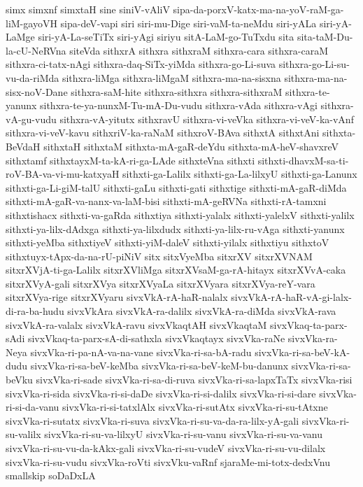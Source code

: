 {simx
simxnf
simxtaH
sine
siniV-vAliV
sipa-da-porxV-katx-ma-na-yoV-raM-ga-liM-gayoVH
sipa-deV-vapi
siri
siri-mu-Dige
siri-vaM-ta-neMdu
siri-yALa
siri-yA-LaMge
siri-yA-La-seTiTx
siri-yAgi
siriyu
sitA-LaM-go-TuTxdu
sita
sita-taM-Du-la-cU-NeRVna
siteVda
sithxrA
sithxra
sithxraM
sithxra-cara
sithxra-caraM
sithxra-ci-tatx-nAgi
sithxra-daq-SiTx-yiMda
sithxra-go-Li-suva
sithxra-go-Li-su-vu-da-riMda
sithxra-liMga
sithxra-liMgaM
sithxra-ma-na-sisxna
sithxra-ma-na-sisx-noV-Dane
sithxra-saM-hite
sithxra-sithxra
sithxra-sithxraM
sithxra-te-yanunx
sithxra-te-ya-nunxM-Tu-mA-Du-vudu
sithxra-vAda
sithxra-vAgi
sithxra-vA-gu-vudu
sithxra-vA-yitutx
sithxravU
sithxra-vi-veVka
sithxra-vi-veV-ka-vAnf
sithxra-vi-veV-kavu
sithxriV-ka-raNaM
sithxroV-BAva
sithxtA
sithxtAni
sithxta-BeVdaH
sithxtaH
sithxtaM
sithxta-mA-gaR-deYdu
sithxta-mA-heV-shavxreV
sithxtamf
sithxtayxM-ta-kA-ri-ga-LAde
sithxteVna
sithxti
sithxti-dhavxM-sa-ti-roV-BA-va-vi-mu-katxyaH
sithxti-ga-Lalilx
sithxti-ga-La-lilxyU
sithxti-ga-Lanunx
sithxti-ga-Li-giM-talU
sithxti-gaLu
sithxti-gati
sithxtige
sithxti-mA-gaR-diMda
sithxti-mA-gaR-va-nanx-va-laM-bisi
sithxti-mA-geRVNa
sithxti-rA-tamxni
sithxtishacx
sithxti-va-gaRda
sithxtiya
sithxti-yalalx
sithxti-yalelxV
sithxti-yalilx
sithxti-ya-lilx-dAdxga
sithxti-ya-lilxdudx
sithxti-ya-lilx-ru-vAga
sithxti-yanunx
sithxti-yeMba
sithxtiyeV
sithxti-yiM-daleV
sithxti-yilalx
sithxtiyu
sithxtoV
sithxtuyx-tApx-da-na-rU-piNiV
sitx
sitxVyeMba
sitxrXV
sitxrXVNAM
sitxrXVjA-ti-ga-Lalilx
sitxrXVliMga
sitxrXVsaM-ga-rA-hitayx
sitxrXVvA-caka
sitxrXVyA-gali
sitxrXVya
sitxrXVyaLa
sitxrXVyara
sitxrXVya-reY-vara
sitxrXVya-rige
sitxrXVyaru
sivxVkA-rA-haR-nalalx
sivxVkA-rA-haR-vA-gi-lalx-di-ra-ba-hudu
sivxVkAra
sivxVkA-ra-dalilx
sivxVkA-ra-diMda
sivxVkA-rava
sivxVkA-ra-valalx
sivxVkA-ravu
sivxVkaqtAH
sivxVkaqtaM
sivxVkaq-ta-parx-sAdi
sivxVkaq-ta-parx-sA-di-sathxla
sivxVkaqtayx
sivxVka-raNe
sivxVka-ra-Neya
sivxVka-ri-pa-nA-va-na-vane
sivxVka-ri-sa-bA-radu
sivxVka-ri-sa-beV-kA-dudu
sivxVka-ri-sa-beV-keMba
sivxVka-ri-sa-beV-keM-bu-danunx
sivxVka-ri-sa-beVku
sivxVka-ri-sade
sivxVka-ri-sa-di-ruva
sivxVka-ri-sa-lapxTaTx
sivxVka-risi
sivxVka-ri-sida
sivxVka-ri-si-daDe
sivxVka-ri-si-dalilx
sivxVka-ri-si-dare
sivxVka-ri-si-da-vanu
sivxVka-ri-si-tatxlAlx
sivxVka-ri-sutAtx
sivxVka-ri-su-tAtxne
sivxVka-ri-sutatx
sivxVka-ri-suva
sivxVka-ri-su-va-da-ra-lilx-yA-gali
sivxVka-ri-su-valilx
sivxVka-ri-su-va-lilxyU
sivxVka-ri-su-vanu
sivxVka-ri-su-va-vanu
sivxVka-ri-su-vu-da-kAkx-gali
sivxVka-ri-su-vudeV
sivxVka-ri-su-vu-dilalx
sivxVka-ri-su-vudu
sivxVka-roVti
sivxVku-vaRnf
sjaraMe-mi-totx-dedxVnu
smallskip
soDaDxLA
}
